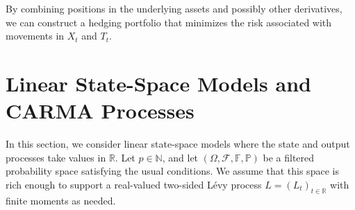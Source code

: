 \documentclass[10pt,a4paper,reqno]{amsart}
\theoremstyle{example}
\begin{document}
By combining positions in the underlying assets and possibly other derivatives,
we can construct a hedging portfolio that minimizes the risk associated with
movements in $X_t$ and $T_t$. 




\appendix{}

\section{Linear State-Space Models and CARMA Processes}\label{sec:carma-processes}

In this section, we consider linear state-space models where the state and output processes take values in $\mathbb{R}$. Let $p \in \mathbb{N}$, and let $(\Omega, \mathcal{F}, \mathbb{F}, \mathbb{P})$ be a filtered probability space satisfying the usual conditions. We assume that this space is rich enough to support a real-valued two-sided L\'evy process $L = (L_t)_{t \in \mathbb{R}}$ with finite moments as needed.
\end{document}
